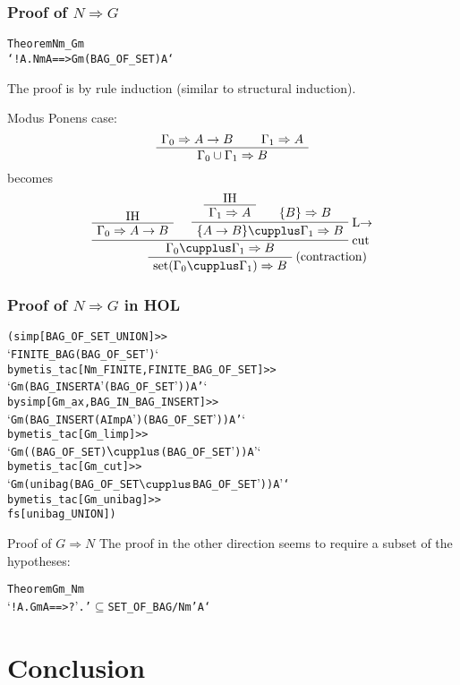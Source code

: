 \documentclass[english,svgnames,hide notes,12pt]{beamer}
\theoremstyle{definition}
\theoremstyle{remark}
\begin{document}
\begin{frame}[fragile]
    \frametitle{Proof of $N\Rightarrow G$}
\small
\begin{alltt}
Theorem Nm_Gm 
    `!\textGamma A. Nm \textGamma A ==> Gm (BAG_OF_SET \textGamma) A`
\end{alltt}
The proof is by rule induction (similar to structural induction). 

Modus Ponens case:
\[
    \AxiomC{$\Gamma_0\Rightarrow A\to B$}
    \AxiomC{$\Gamma_1\Rightarrow A$}
    \BinaryInfC{$\Gamma_0\cup\Gamma_1 \Rightarrow B$}
    \DisplayProof\]
becomes
\[
    \AxiomC{IH}
    \UnaryInfC{$\Gamma_0 \Rightarrow A \to B$}
    \AxiomC{IH}
    \UnaryInfC{$\Gamma_1 \Rightarrow A$}
    \AxiomC{$\{B\} \Rightarrow B$}
    \RightLabel{L$\to$}
    \BinaryInfC{$\{A\to B\}\cupplus\Gamma_1\Rightarrow B$}
    \RightLabel{cut}
    \BinaryInfC{$\Gamma_0\cupplus\Gamma_1\Rightarrow B$}
    \RightLabel{(contraction)}
    \UnaryInfC{$\text{set}(\Gamma_0\cupplus\Gamma_1)\Rightarrow B$}
    \DisplayProof
\]

\end{frame}

\begin{frame}[fragile] 
    \frametitle{Proof of $N\Rightarrow G$ in HOL}
    \small
\begin{alltt}
(simp[BAG_OF_SET_UNION] >>
`FINITE_BAG (BAG_OF_SET \textGamma')` 
  by metis_tac[Nm_FINITE,FINITE_BAG_OF_SET] >>
`Gm (BAG_INSERT A' (BAG_OF_SET \textGamma')) A'`
  by simp[Gm_ax,BAG_IN_BAG_INSERT] >>
`Gm (BAG_INSERT (A Imp A') (BAG_OF_SET \textGamma')) A'`
  by metis_tac[Gm_limp] >>
`Gm ((BAG_OF_SET \textGamma) \(\cupplus\) (BAG_OF_SET \textGamma')) A'`
  by metis_tac[Gm_cut] >>
`Gm (unibag (BAG_OF_SET \textGamma \(\cupplus\) BAG_OF_SET \textGamma')) A'` 
  by metis_tac[Gm_unibag] >>
fs[unibag_UNION])
\end{alltt}
\end{frame}

\begin{frame}[fragile]{Proof of $G\Rightarrow N$}
    The proof in the other direction seems to require a subset of the hypotheses:
    \begin{alltt}
Theorem Gm_Nm 
`!\textGamma A. Gm \textGamma A ==> ?\textGamma'. \textGamma' \(\subseteq\) SET_OF_BAG \textGamma /\bs{} Nm \textGamma' A` 
    \end{alltt}
\end{frame}

\section{Conclusion}
\end{document}
